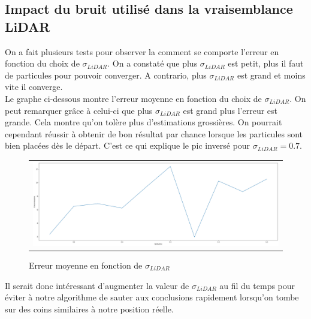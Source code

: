 \documentclass[11pt]{article}		%
\begin{document}
\newpage
\subsection{Impact du bruit utilisé dans la vraisemblance LiDAR}

\noindent On a fait plusieurs tests pour observer la comment se comporte l'erreur en fonction du choix de $\sigma_{LiDAR}$. On a constaté que plus $\sigma_{LiDAR}$ est petit, plus il faut de particules pour pouvoir converger. A contrario, plus $\sigma_{LiDAR}$ est grand et moins vite il converge. \\

\noindent Le graphe ci-dessous montre l'erreur moyenne en fonction du choix de $\sigma_{LiDAR}$. On peut remarquer grâce à celui-ci que plus $\sigma_{LiDAR}$ est grand plus l'erreur est grande. Cela montre qu'on tolère plus d'estimations grossières. On pourrait cependant réussir à obtenir de bon résultat par chance lorsque les particules sont bien placées dès le départ. C'est ce qui explique le pic inversé pour $\sigma_{LiDAR} = 0.7$. 

\vspace{0.3in}
\label{LFP}
\begin{figure}[ht]
 \begin{center}
  \begin{tabular}{c}
    \includegraphics[width=1.0\textwidth]{lfp_slidar_err.png} 
  \end{tabular}
 \end{center}
 \vspace{-0.3in}
 \caption{Erreur moyenne en fonction de $\sigma_{LiDAR}$}
 \label{LFP}
\end{figure}

\newpage
\noindent Il serait donc intéressant d'augmenter la valeur de $\sigma_{LiDAR}$ au fil du temps pour éviter à notre algorithme de sauter aux conclusions rapidement lorsqu'on tombe sur des coins similaires à notre position réelle. 
\end{document}
